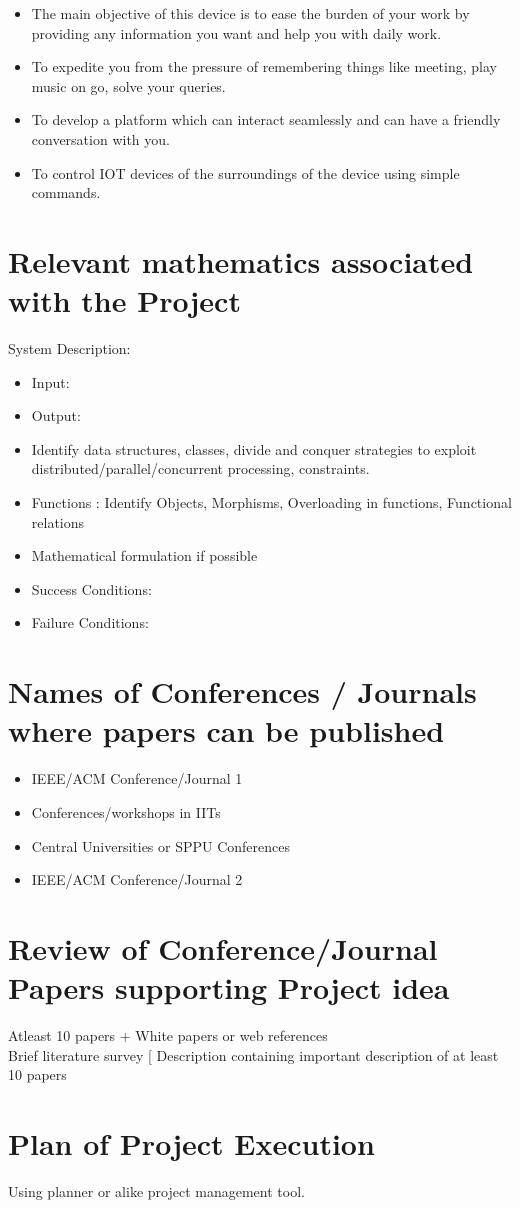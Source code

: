 \documentclass[oneside,a4paper,12pt]{article}
\begin{document}
\begin{itemize}
	\item The main objective of this device is to ease the burden of your work by providing any information you want and help you with daily work.
	\item To expedite you from the pressure of remembering things like meeting, play music on go, solve your queries.
	\item To develop a platform which can interact seamlessly and can have a friendly conversation with you.
	\item To control IOT devices of the surroundings of the device using simple commands.
\end{itemize}

	
\section{Relevant mathematics associated with the Project}
\label{sec:math}
System Description:
\begin{itemize} 
\item Input:	 
\item Output:	 
\item Identify data structures, classes, divide and conquer strategies to exploit distributed/parallel/concurrent processing, constraints. 
\item Functions : Identify Objects, Morphisms, Overloading in functions, Functional relations
\item Mathematical formulation if possible
\item Success Conditions:	 
\item Failure Conditions:		
\end{itemize}


\section{Names of Conferences / Journals where papers can be published}
\begin{itemize}
\item  IEEE/ACM Conference/Journal 1 
\item  Conferences/workshops in IITs
\item  Central Universities or SPPU Conferences 
\item IEEE/ACM Conference/Journal 2 
\end{itemize}


\section{Review of Conference/Journal Papers supporting Project idea}
\label{sec:survey}
   Atleast 10 papers + White papers or web references\\
   Brief literature survey [ Description containing important description of at least 10 papers

\section{Plan of Project Execution}
  Using planner or alike project management tool.
\end{document}
